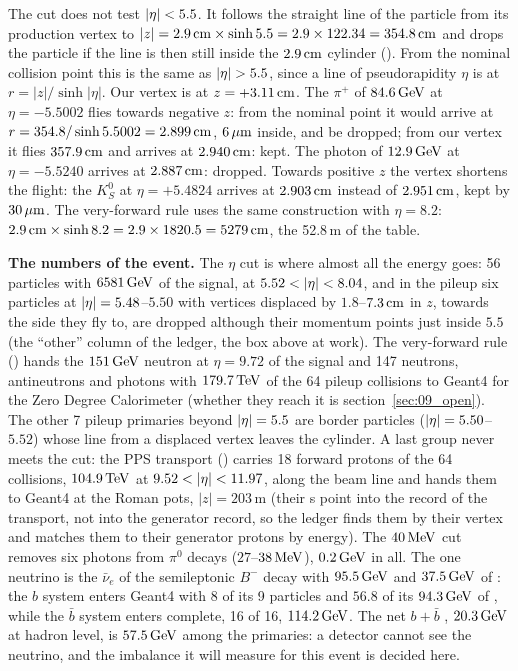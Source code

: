 \begin{plainwords}
The cut does not test $|\eta|<5.5$. It follows the straight line of the particle from its production vertex to
$|z| = 2.9\,\mathrm{cm}\times\sinh5.5 = 2.9\times122.34 = 354.8\,\mathrm{cm}$ and drops the particle if the line is then still inside
the $2.9\,\mathrm{cm}$ cylinder (). From the nominal collision point this is the same as $\abseta>5.5$,
since a line of pseudorapidity $\eta$ is at $r=|z|/\sinh|\eta|$. Our vertex is at $z=+3.11\,\mathrm{cm}$. The $\pi^+$ of
$84.6\,\mathrm{GeV}$ at $\eta=-5.5002$ flies towards negative $z$: from the nominal point it would arrive at
$r=354.8/\sinh5.5002=2.899\,\mathrm{cm}$, $6\,\mu\mathrm{m}$ inside, and be dropped; from our vertex it flies $357.9\,\mathrm{cm}$ and arrives at
$2.940\,\mathrm{cm}$: kept. The photon of $12.9\,\mathrm{GeV}$ at $\eta=-5.5240$ arrives at $2.887\,\mathrm{cm}$: dropped. Towards positive $z$
the vertex shortens the flight: the $K^0_S$ at $\eta=+5.4824$ arrives at $2.903\,\mathrm{cm}$ instead of $2.951\,\mathrm{cm}$, kept by
$30\,\mu\mathrm{m}$. The very-forward rule uses the same construction with $\eta=8.2$: $2.9\,\mathrm{cm}\times\sinh8.2 = 2.9\times1820.5 =
5279\,\mathrm{cm}$, the 52.8\,m of the table.
\end{plainwords}

\textbf{The numbers of the event.} The $\eta$ cut is where almost all the energy goes: 56 particles with
$6581\,\mathrm{GeV}$ of the signal, at $5.52<\abseta<8.04$, and in the pileup six particles at $|\eta| = 5.48$--$5.50$
with vertices displaced by $1.8$--$7.3\,\mathrm{cm}$ in $z$, towards the side they fly to, are dropped although their
momentum points just inside $5.5$ (the
``other'' column of the ledger, the box above at work). The very-forward rule
() hands the $151\,\mathrm{GeV}$ neutron at $\eta = 9.72$ of the signal and 147 neutrons,
antineutrons and photons with $179.7\,\mathrm{TeV}$ of the 64 pileup collisions to Geant4 for the Zero Degree Calorimeter (whether they reach
it is section~\ref{sec:09_open}). The other 7
pileup primaries beyond $|\eta|=5.5$ are border particles ($|\eta|=5.50$--$5.52$) whose line from a displaced
vertex leaves the cylinder. A last group never meets the cut: the PPS transport () carries 18
forward protons of the 64 collisions, $104.9\,\mathrm{TeV}$ at $9.52<\abseta<11.97$, along the beam line and hands them to
Geant4 at the Roman pots, $|z|=203$\,m (their s point into the record of the transport, not into the
generator record, so the ledger finds them by their vertex and matches them to their generator protons by
energy). The $40\,\mathrm{MeV}$ cut removes six
photons from $\pi^0$ decays ($27$--$38\,\mathrm{MeV}$), $0.2\,\mathrm{GeV}$ in all. The one neutrino is the $\bar\nu_e$ of the
semileptonic $B^-$ decay with $95.5\,\mathrm{GeV}$ and $37.5\,\mathrm{GeV}$ of \pt{}: the $b$ system enters Geant4 with 8 of its 9
particles and $56.8$ of its $94.3\,\mathrm{GeV}$ of \pt{}, while the $\bar b$ system enters complete, 16 of 16,
$114.2\,\mathrm{GeV}$. The net $b+\bar b$ \pt{}, $20.3\,\mathrm{GeV}$ at hadron level, is $57.5\,\mathrm{GeV}$ among the primaries: a detector
cannot see the neutrino, and the imbalance it will measure for this event is decided here.

